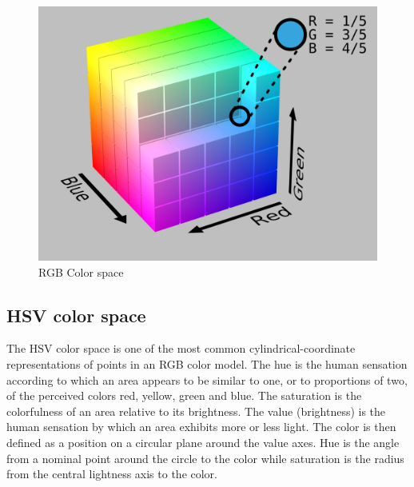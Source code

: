 \begin{figure}[h]
\centering

\includegraphics[scale=0.1]{RGBColorSpace}
\caption{RGB Color space}

\label{fig:RGBColorSpace}
\end{figure}

\subsection{HSV color space}\label{sec:PREPROC:hsv}

The HSV color space is one of the most common cylindrical-coordinate representations of points in an RGB color model. The hue is the human sensation according to which an area appears to be similar to one, or to proportions of two, of the perceived colors red, yellow, green and blue. The saturation is the colorfulness of an area relative to its brightness.  The value (brightness) is the human sensation by which an area exhibits more or less light. The color is then defined as a position on a circular plane around the value axes. Hue is the angle from a nominal point around the circle to the color while saturation is the radius from the central lightness axis to the color.

